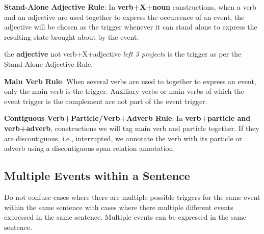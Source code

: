 \noindent\textbf{Stand-Alone Adjective Rule}:
In \textbf{verb+X+noun} constructions, when a verb and an adjective are used together to express the occurrence of an event, the adjective will be chosen as the trigger whenever it can stand alone to express the resulting state brought about by the event.

\begin{exe}
    \ex {}
        \expl the \textbf{adjective}  not verb+X+adjective \textit{left 3 projects} is the trigger as per the Stand-Alone Adjective Rule.
\end{exe}

\noindent\textbf{Main Verb Rule}: When several verbs are used to together to express an event, only the main verb is the trigger. Auxiliary verbs or main verbs of which the event trigger is the complement are not part of the event trigger.
\begin{exe}
    \ex {}
    \ex {}
    \ex {}
    \ex {}
\end{exe}

\noindent\textbf{Contiguous Verb+Particle/Verb+Adverb Rule}:
In \textbf{verb+particle and verb+adverb}, constructions we will tag main verb and particle together.
If they are discontiguous, i.e., interrupted, we annotate the verb with its particle or adverb using a discontiguous span relation annotation.

\begin{exe}
    \ex {}
    \ex {}
    \ex {}
    \ex {}
\end{exe}

\subsection{Multiple Events within a Sentence}
Do not confuse cases where there are multiple possible triggers for the same event within the same sentence with cases where there multiple different events expressed in the same sentence.
Multiple events can be expressed in the same sentence.

